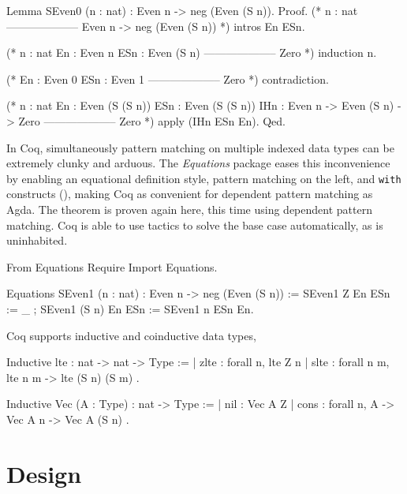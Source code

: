 \documentclass{mproj}
\begin{document}
\begin{coq}
    Lemma SEven0 (n : nat) : Even n -> neg (Even (S n)).
    Proof.
      (* n : nat
         --------------------
         Even n -> neg (Even (S n)) *)
      intros En ESn.

      (* n : nat 
         En : Even n
         ESn : Even (S n)
         --------------------
         Zero *)
      induction n.

      (* En : Even 0
         ESn : Even 1
         --------------------
         Zero *)
      contradiction.

      (* n : nat
         En : Even (S (S n))
         ESn : Even (S (S n))
         IHn : Even n -> Even (S n) -> Zero
         --------------------
         Zero *)
      apply (IHn ESn En).
    Qed.
\end{coq}

In Coq, simultaneously pattern matching on multiple indexed data types can be extremely clunky and arduous. The \emph{Equations} package eases this inconvenience by enabling an equational definition style, pattern matching on the left, and \texttt{with} constructs (\cite{McBride2004}), making Coq as convenient for dependent pattern matching as Agda. The theorem  is proven again here, this time using dependent pattern matching. Coq is able to use tactics to solve the base case automatically, as  is uninhabited.

\begin{coq}
    From Equations Require Import Equations.

    Equations SEven1 (n : nat) : Even n -> neg (Even (S n)) := {
    SEven1 Z     En ESn := _ ;
    SEven1 (S n) En ESn := SEven1 n ESn En}.
\end{coq}

Coq supports inductive and coinductive data types,

\begin{coq}
    Inductive lte : nat -> nat -> Type :=
    | zlte : forall {n}, lte Z n
    | slte : forall {n m}, lte n m -> lte (S n) (S m)
    .

    Inductive Vec (A : Type) : nat -> Type :=
    | nil  : Vec A Z
    | cons : forall {n}, A -> Vec A n -> Vec A (S n)
    .
\end{coq}

\chapter{Design}\label{design}
\end{document}
